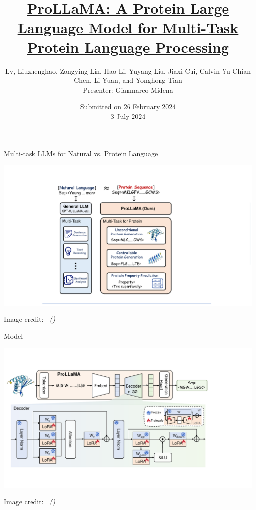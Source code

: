 \documentclass[dvipsnames,
hyperref={colorlinks,citecolor=black}
]{beamer}
\title[ProLLaMA]
{\href{https://doi.org/10.48550/arXiv.2402.16445}{ProLLaMA: A Protein Large Language Model for Multi-Task Protein Language Processing}}
\author[Liuzhenghao Lv et al.]{Lv, Liuzhenghao, Zongying Lin, Hao Li, Yuyang Liu, Jiaxi Cui, Calvin Yu-Chian Chen, Li Yuan, and Yonghong Tian
\\\vspace{2em}Presenter: Gianmarco Midena}
\date[3 July 2024]{Submitted on 26 February 2024 
\\\vspace{2em}3 July 2024}
\newcommand{\credit}[2]{\par\hfill \tiny #1 credit:~\itshape\citeauthor{#2} (\citeyear{#2})}
\begin{document}
\begin{frame}
\titlepage
\end{frame}


\begin{frame}{Multi-task LLMs for Natural vs. Protein Language}
	\begin{center}
		\includegraphics[scale=0.5]{images/multitask_LLMs_NLP_vs_PLP.pdf}
	\end{center}
	\credit{Image}{lv2024prollama}
\end{frame}

\begin{frame}{Model}
	\begin{center}
		\includegraphics[scale=0.44]{images/model.pdf}
	\end{center}
	\credit{Image}{lv2024prollama}
\end{frame}
\end{document}

